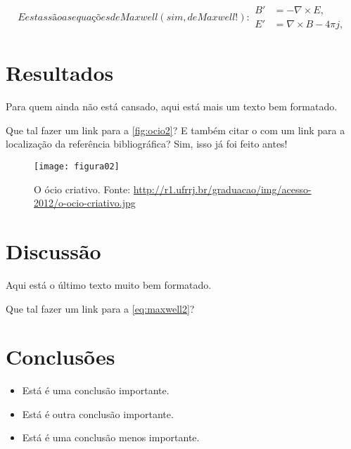 \begin{subequations}\label{eq:maxwell2}
E estas são as equações de Maxwell (sim, de Maxwell!):
\begin{align}
        B'&=-\nabla \times E,\\
        E'&=\nabla \times B - 4\pi j,
\end{align}
\end{subequations}

\section{Resultados}

Para quem ainda não está cansado, aqui está mais um texto bem formatado. 
\blindtext[1]

Que tal fazer um link para a \autoref{fig:ocio2}? E também citar o 
\citet{Feyerabend1977} com um link para a localização da referência 
bibliográfica? Sim, isso já foi feito antes!

\begin{figure}[!ht]
\centering
\texttt{[image: figura02]}
\caption{\label{fig:ocio2}O ócio criativo. Fonte: 
\url{http://r1.ufrrj.br/graduacao/img/acesso-2012/o-ocio-criativo.jpg}}
\end{figure}

\section{Discussão}

Aqui está o último texto muito bem formatado. \blindtext[2]

Que tal fazer um link para a \autoref{eq:maxwell2}?

\section{Conclusões}

\begin{itemize}
  \item Está é uma conclusão importante.
  \item Está é outra conclusão importante.
  \item Está é uma conclusão menos importante.
\end{itemize}
